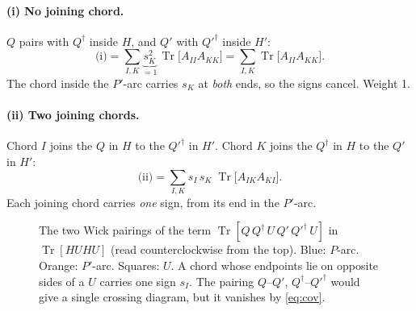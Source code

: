 \documentclass[11pt]{article}
\newcommand{\Tr}{\operatorname{Tr}}
\newcommand{\chord}[4][]{\draw[#1] ({#2}:{#4}) .. controls ({#2}:{0.32*#4}) and ({#3}:{0.32*#4}) .. ({#3}:{#4});}
\newcommand{\Umk}[2]{\node[Umark] at ({#1}:{#2}) {};}
\begin{document}
\paragraph{(i) No joining chord.} $Q$ pairs with $Q^\dagger$ inside $H$, and $Q'$ with $Q'^\dagger$ inside $H'$:
\begin{equation}
\text{(i)}=\sum_{I,K}\underbrace{s_K^2}_{=1}\,\Tr\big[A_{II}A_{KK}\big]=\sum_{I,K}\Tr\big[A_{II}A_{KK}\big].
\end{equation}
The chord inside the $P'$-arc carries $s_K$ at \emph{both} ends, so the signs cancel. Weight 1.

\paragraph{(ii) Two joining chords.} Chord $I$ joins the $Q$ in $H$ to the $Q'^\dagger$ in $H'$. Chord $K$ joins the
$Q^\dagger$ in $H$ to the $Q'$ in $H'$:
\begin{equation}
\text{(ii)}=\sum_{I,K}s_I\,s_K\;\Tr\big[A_{IK}A_{KI}\big].
\end{equation}
Each joining chord carries \emph{one} sign, from its end in the $P'$-arc.

\begin{figure}[!ht]
\centering
{}
\caption{The two Wick pairings of the term $\Tr[Q\,Q^\dagger\,U\,Q'\,Q'^\dagger\,U]$ in $\Tr[HUHU]$ (read
counterclockwise from the top). Blue: $P$-arc. Orange: $P'$-arc. Squares: $U$. A chord whose endpoints lie on opposite
sides of a $U$ carries one sign $s_I$. The pairing $Q$--$Q'$, $Q^\dagger$--$Q'^\dagger$ would give a single crossing
diagram, but it vanishes by \eqref{eq:cov}.}
\end{figure}
\end{document}
